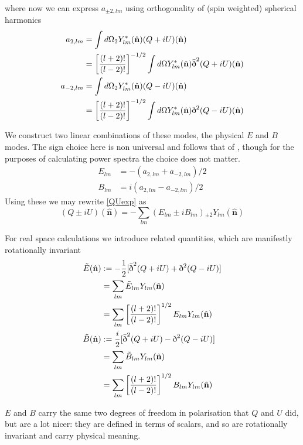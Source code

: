 \documentclass[a4paper,10pt]{article}
\renewcommand{\v}[1]{\mathbf{#1}}
\newcommand{\half}{\frac{1}{2}}
\newcommand{\unit}[1]{\hat{\v{#1}}}
\newcommand{\sr}{\text{\normalfont\dh}}
\renewcommand{\sl}{\bar{\text{\normalfont\dh}}}
\newcommand{\ltwo}{\left[\frac{(l+2)!}{(l-2)!}\right]}
\begin{document}
where now we can express $a_{\pm2,lm}$ using orthogonality of (spin weighted) spherical harmonics
\begin{equation}\begin{split}
a_{2,lm} &= \int d\Omega {}_2Y_{lm}^*(\unit{n})(Q+iU)(\unit{n})\\
&= \ltwo^{-1/2}\int d\Omega Y_{lm}^*(\unit{n})\sl^2(Q+iU)(\unit{n})\\
a_{-2,lm} &= \int d\Omega {}_2Y_{lm}^*(\unit{n})(Q-iU)(\unit{n})\\
&= \ltwo^{-1/2}\int d\Omega Y_{lm}^*(\unit{n})\sr^2(Q-iU)(\unit{n})
\end{split}\end{equation}

We construct two linear combinations of these modes, the physical $E$ and $B$ modes. The sign choice here is non universal and follows that of \cite{all-sky}, though for the purposes of calculating power spectra the choice does not matter.
\begin{equation}\begin{split} 
E_{lm} &= -(a_{2,lm} + a_{-2,lm})/2\\
B_{lm} &= i(a_{2,lm} - a_{-2,lm})/2
\end{split}\end{equation}
Using these we may rewrite \ref{QUexp} as 
\begin{equation}
(Q\pm iU)(\unit{n}) = -\sum_{lm} (E_{lm} \pm i B_{lm}) {}_{\pm2}Y_{lm}(\unit{n})
\label{QUEB}
\end{equation}

For real space calculations we introduce related quantities, which are manifestly rotationally invariant
\begin{equation}\begin{split}
\tilde{E}(\unit{n}) &:= -\half[\sl^2(Q+iU) + \sr^2(Q-iU)]\\
&= \sum_{lm} \tilde{E}_{lm}Y_{lm}(\unit{n})\\
&= \sum_{lm} \ltwo^{1/2}E_{lm}Y_{lm}(\unit{n})\\
\tilde{B}(\unit{n}) &:= \frac{i}{2}[\sl^2(Q+iU) - \sr^2(Q-iU)]\\
&= \sum_{lm} \tilde{B}_{lm}Y_{lm}(\unit{n})\\
&= \sum_{lm} \ltwo^{1/2}B_{lm}Y_{lm}(\unit{n})
\label{EBmodes}
\end{split}\end{equation}

$E$ and $B$ carry the same two degrees of freedom in polarisation that $Q$ and $U$ did, but are a lot nicer: they are defined in terms of scalars, and so are rotationally invariant and carry physical meaning.
\end{document}
